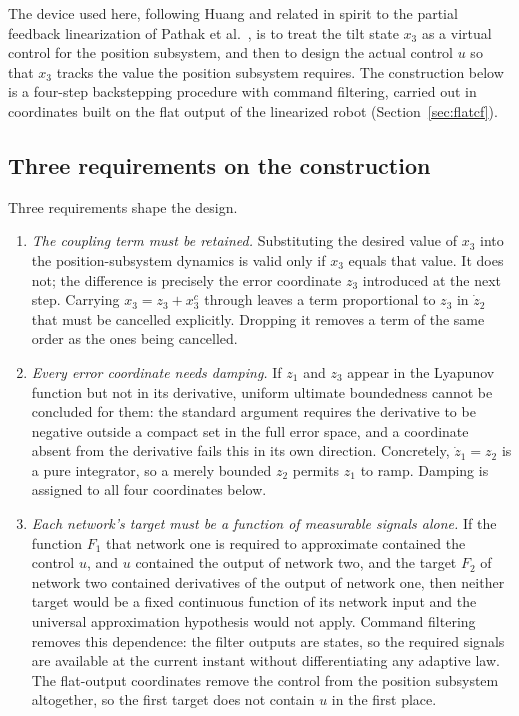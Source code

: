 The device used here, following Huang \cite{huang2002lyapunov} and related in
spirit to the partial feedback linearization of Pathak et al.\
\cite{pathak2005twip}, is to treat
the tilt state $x_3$ as a virtual control for the position subsystem, and then
to design the actual control $u$ so that $x_3$ tracks the value the position
subsystem requires. The construction below is a four-step backstepping
procedure with command filtering, carried out in coordinates built on the flat
output of the linearized robot (Section~\ref{sec:flatcf}).

\subsection{Three requirements on the construction}

Three requirements shape the design.

\begin{enumerate}[label=(R\arabic*),leftmargin=*]

\item \emph{The coupling term must be retained.} Substituting the desired value
of $x_3$ into the position-subsystem dynamics is valid only if $x_3$ equals that
value. It does not; the difference is precisely the error coordinate $z_3$
introduced at the next step. Carrying $x_3=z_3+x_3^c$ through leaves a term
proportional to $z_3$ in $\dot z_2$ that must be cancelled explicitly. Dropping
it removes a term of the same order as the ones being cancelled.

\item \emph{Every error coordinate needs damping.} If $z_1$ and $z_3$ appear in
the Lyapunov function but not in its derivative, uniform ultimate boundedness
cannot be concluded for them: the standard argument requires the derivative to
be negative outside a compact set in the full error space, and a coordinate
absent from the derivative fails this in its own direction. Concretely,
$\dot z_1=z_2$ is a pure integrator, so a merely bounded $z_2$ permits $z_1$ to
ramp. Damping is assigned to all four coordinates below.

\item \emph{Each network's target must be a function of measurable signals
alone.} If the function $F_1$ that network one is required to approximate
contained the control $u$, and $u$ contained the output of network two, and the
target $F_2$ of network two contained derivatives of the output of network one,
then neither target would be a fixed continuous function of its network input
and the universal approximation hypothesis would not apply. Command filtering
removes this dependence: the filter outputs are states, so the required signals
are available at the current instant without differentiating any adaptive law.
The flat-output coordinates remove the control from the position subsystem
altogether, so the first target does not contain $u$ in the first place.

\end{enumerate}

